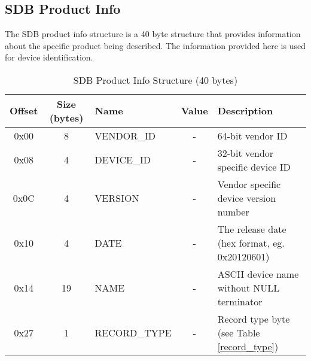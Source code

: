 \documentclass[a4paper, 12pt]{article}
\begin{document}
\subsection{SDB Product Info}

The SDB product info structure is a 40 byte structure that provides information about
the specific product being described. The information provided here is used for device
identification.

\begin{center}
  \begin{savenotes}
    \begin{table}[!ht]\footnotesize
      \caption{SDB Product Info Structure (40 bytes)}\label{sdwb_product_struct}\centering
        \begin{tabular}{| c | c | l | c | p{5cm} |} \hline
        Offset & Size (bytes) & Name & Value & Description \\ \hline
        0x00 & 8 & VENDOR\_ID & - & 64-bit vendor ID \\ \hline
        0x08 & 4 & DEVICE\_ID & - & 32-bit vendor specific device ID \\ \hline
        0x0C & 4 & VERSION & - & Vendor specific device version number \\ \hline
        0x10 & 4 & DATE & - & The release date (hex format, eg. 0x20120601) \\ \hline
        0x14 & 19 & NAME & - & ASCII device name without NULL terminator \\ \hline
        0x27 & 1 & RECORD\_TYPE & - & Record type byte (see Table \ref{record_type}) \\ \hline
        \end{tabular}
    \end{table}
  \end{savenotes}
\end{center}
\end{document}
